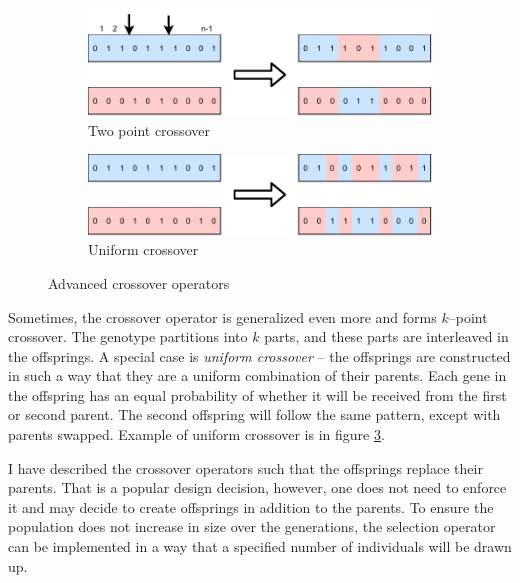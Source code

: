 \begin{figure}
    \begin{subfigure}[b]{0.4\textwidth}
        \includegraphics[width=\textwidth]{img/master_twopointcrossover.pdf}
        \caption{Two point crossover}
        \label{fig:gatwopointcrossover}
    \end{subfigure}
    \hfill
    \begin{subfigure}[b]{0.4\textwidth}
        \includegraphics[width=\textwidth]{img/master_uniformcrossover.pdf}
        \caption{Uniform crossover}
        \label{fig:uniformcrossover}
    \end{subfigure}
    \caption{Advanced crossover operators}
\end{figure}

Sometimes, the crossover operator is generalized even more and forms $k$--point crossover. The genotype partitions into $k$ parts, and these parts are interleaved in the offsprings. A special case is \emph{uniform crossover} -- the offsprings are constructed in such a way that they are a uniform combination of their parents. Each gene in the offspring has an equal probability of whether it will be received from the first or second parent. The second offspring will follow the same pattern, except with parents swapped. Example of uniform crossover is in figure \ref{fig:uniformcrossover}.

I have described the crossover operators such that the offsprings replace their parents. That is a popular design decision, however, one does not need to enforce it and may decide to create offsprings in addition to the parents. To ensure the population does not increase in size over the generations, the selection operator can be implemented in a way that a specified number of individuals will be drawn up.

